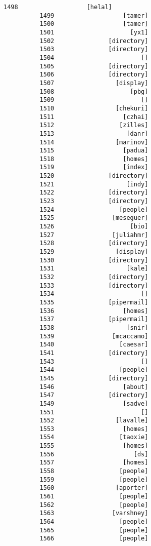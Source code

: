 \documentclass[11pt]{article}
\begin{document}
\begin{Verbatim}[commandchars=\\\{\}]
          1498                   [helal]
          1499                   [tamer]
          1500                   [tamer]
          1501                     [yx1]
          1502               [directory]
          1503               [directory]
          1504                        []
          1505               [directory]
          1506               [directory]
          1507                 [display]
          1508                     [pbg]
          1509                        []
          1510                 [chekuri]
          1511                   [czhai]
          1512                  [zilles]
          1513                    [danr]
          1514                 [marinov]
          1515                   [padua]
          1518                   [homes]
          1519                   [index]
          1520               [directory]
          1521                    [indy]
          1522               [directory]
          1523               [directory]
          1524                  [people]
          1525                [meseguer]
          1526                     [bio]
          1527                [juliahmr]
          1528               [directory]
          1529                 [display]
          1530               [directory]
          1531                    [kale]
          1532               [directory]
          1533               [directory]
          1534                        []
          1535               [pipermail]
          1536                   [homes]
          1537               [pipermail]
          1538                    [snir]
          1539                [mcaccamo]
          1540                  [caesar]
          1541               [directory]
          1543                        []
          1544                  [people]
          1545               [directory]
          1546                   [about]
          1547               [directory]
          1549                   [sadve]
          1551                        []
          1552                 [lavalle]
          1553                   [homes]
          1554                  [taoxie]
          1555                   [homes]
          1556                      [ds]
          1557                   [homes]
          1558                  [people]
          1559                  [people]
          1560                 [aporter]
          1561                  [people]
          1562                  [people]
          1563                [varshney]
          1564                  [people]
          1565                  [people]
          1566                  [people]

\end{Verbatim}
\end{document}
